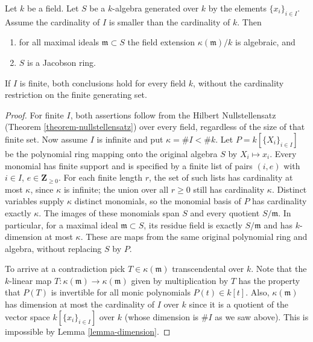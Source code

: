 \begin{theorem}
\label{theorem-uncountable-nullstellensatz}
Let $k$ be a field. Let $S$ be a $k$-algebra generated over $k$
by the elements $\{x_i\}_{i \in I}$. Assume the cardinality of $I$
is smaller than the cardinality of $k$. Then
\begin{enumerate}
\item for all maximal ideals $\mathfrak m \subset S$ the field
extension $\kappa(\mathfrak m)/k$
is algebraic, and
\item $S$ is a Jacobson ring.
\end{enumerate}
If $I$ is finite, both conclusions hold for every field $k$, without
the cardinality restriction on the finite generating set.
\end{theorem}

\begin{proof}
For finite $I$, both assertions follow from the Hilbert
Nullstellensatz (Theorem \ref{theorem-nullstellensatz}) over every
field, regardless of the size of that finite set. Now assume $I$
is infinite and put $\kappa=\#I<\#k$.
Let $P=k[\{X_i\}_{i\in I}]$ be the polynomial ring mapping onto
the original algebra $S$ by $X_i\mapsto x_i$. Every monomial has
finite support and is specified by a finite list of pairs
$(i,e)$ with $i\in I$, $e\in\mathbf Z_{\geq0}$.
For each finite length $r$, the set of such lists has cardinality
at most $\kappa$, since $\kappa$ is infinite; the union over all
$r\geq0$ still has cardinality $\kappa$.
Distinct variables supply $\kappa$ distinct monomials, so the
monomial basis of $P$ has cardinality exactly $\kappa$.
The images of these monomials span $S$ and every quotient $S/\mathfrak m$.
In particular, for a maximal ideal $\mathfrak m\subset S$, its
residue field is exactly $S/\mathfrak m$ and has $k$-dimension
at most $\kappa$. These are maps from the same original polynomial
ring and algebra, without replacing $S$ by $P$.

\medskip\noindent
To arrive at a contradiction pick $T \in \kappa(\mathfrak m)$ transcendental
over $k$. Note that the $k$-linear map
$T : \kappa(\mathfrak m) \to \kappa(\mathfrak m)$
given by multiplication by $T$ has the property that $P(T)$ is invertible
for all monic polynomials $P(t) \in k[t]$.
Also, $\kappa(\mathfrak m)$ has dimension at most the cardinality of $I$
over $k$ since it is a quotient of the vector space
$k[\{x_i\}_{i \in I}]$ over $k$ (whose dimension is $\# I$ as we saw above).
This is impossible by Lemma \ref{lemma-dimension}.


\end{proof}
